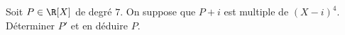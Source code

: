 \begin{enonce}
  \begin{exercise}[ID={RMS 122-2 E1309 CCP PC},subtitle={},tags={colle},difficulty={}]
  Soit $P\in\R[X]$ de degré $7$.
  On suppose que $P+i$ est multiple de $(X-i)^4$.\\
  Déterminer $P'$ et en déduire $P$.
\end{exercise}
\begin{solution}
\end{solution}
\end{enonce}
